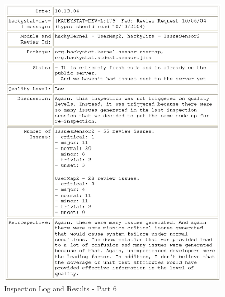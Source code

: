 \begin{figure}[htbp]
  \centering
  \includegraphics[width=1.0\textwidth]{figs/engineeringlog_word_html_6.eps}
  \caption{Inspection Log and Results - Part 6}
  \label{fig:log6}
\end{figure}

